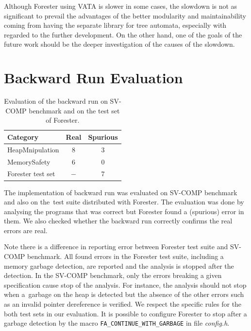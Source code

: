 Although Forester using VATA is slower in some cases,
the slowdown is not as significant to prevail
the advantages of the better modularity
and maintainability coming from having the separate library
for tree automata, especially with regarded to the further development.
On the other hand, one of the goals of the future work should be
the deeper investigation of the causes of the slowdown.


\section{Backward Run Evaluation}
\label{sec:bweval}

\begin{table}[bt]
	\vskip6pt
	\caption{Evaluation of the backward run on SV-COMP benchmark
		and on the test set of Forester.
	}
	\centering
	\begin{tabular}{| l | c | c |}
		\hline
		Category & Real & Spurious \\
		\hline
		\hline
		HeapMnipulation & $8$ & $3$ \\
		\hline
		MemorySafety & $6$ & $0$ \\
		\hline
		Forester test set & $-$ & $7$ \\
		\hline
	\end{tabular}
	\label{tab:bwres}
\end{table}

The implementation of backward run was evaluated on SV-COMP benchmark
and also on the~test suite distributed with Forester.
The evaluation was done by analysing the programs that was correct
but Forester found a (spurious) error in them.
We also checked whether the backward run correctly
confirms the real errors are real.

Note there is a difference in reporting error between
Forester test suite and SV-COMP benchmark.
All found errors in the Forester test suite, including a memory garbage
detection, are reported and the analysis is stopped after the detection.
In the SV-COMP benchmark, only the errors breaking a given specification
cause stop of the analysis.
For instance, the analysis should not stop when
a~garbage on the heap is detected but the absence of the other errors such
as an invalid pointer dereference is verified.
We respect the specific rules for the both test sets in our evaluation.
It is possible to configure
Forester to stop after a garbage detection by
the macro {\tt FA\_CONTINUE\_WITH\_GARBAGE} in file \emph{config.h}.

